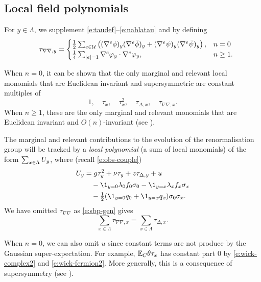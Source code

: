 
\subsection{Local field polynomials}

For $y \in \Lambda$, we supplement \eqref{e:taudef}--\eqref{e:nablatau} and 
by defining
\begin{equation}
\label{e:tauphi2}
\quad \tau_{\nabla\nabla,y}
	=
\begin{cases}
\frac 12 \sum_{e \in \mathcal{U}}
\left(
	(\nabla^e \phi)_y (\nabla^e \bar\phi)_y +
	(\nabla^e \psi)_y (\nabla^e \bar\psi)_y
\right),
	& n = 0 \\
\frac{1}{4} \sum_{|e| = 1} \nabla^e \varphi_y \cdot \nabla^e \varphi_y,
	& n \ge 1.
\end{cases}
\end{equation}

When $n = 0$, it can be shown that the only marginal and relevant local monomials
that are Euclidean invariant and supersymmetric are constant multiples of
\begin{equation}
1, \quad \tau_x, \quad \tau_x^2, \quad \tau_{\Delta,x}, \quad \tau_{\nabla\nabla,x}.
\end{equation}
When $n \ge 1$, these are the only marginal and relevant monomials that are Euclidean
invariant and $O(n)$-invariant (see \cite{BBS-rg-pt}).

The marginal and relevant contributions to the evolution of the renormalisation group
will be tracked by a \emph{local polynomial} (a sum of local monomials) of the form
$\sum_{x\in\Lambda} U_y$, where (recall \eqref{e:obs-couple})
\begin{align}
\lbeq{Vy}
\Vc_y
	&=
g \tau_y^2 + \nu \tau_y + z \tau_{\Delta,y}
	+ u
		\nnb&\quad
	- \1_{y=\pp}\lambda_{\pp} f_0 \sigma_0
	- \1_{y=\qq}\lambda_{\qq} f_x \sigma_x
		\nnb&\quad
	- \textstyle{\frac 12} (\1_{y=\pp} q_\pp + \1_{y=\qq}q_\qq )\sigma_\pp\sigma_\qq.
\end{align}
We have omitted $\tau_{\nabla\nabla}$ as \eqref{e:sbp-gen} gives
\begin{equation}
\label{e:nabla-delta}
\sum_{x\in\Lambda} \tau_{\nabla\nabla,x} = \sum_{x\in\Lambda} \tau_{\Delta,x}.
\end{equation}

\begin{rk}
\label{rk:noconst}
When $n = 0$, we can also omit $u$ since constant terms are not produce by the 
Gaussian super-expectation. For example, $\mathbb{E}_C\theta \tau_x$ has constant part
$0$ by \eqref{e:wick-complex2} and \eqref{e:wick-fermion2}. More generally,
this is a consequence of supersymmetry (see \cite{BBS-rg-pt}).
\end{rk}

